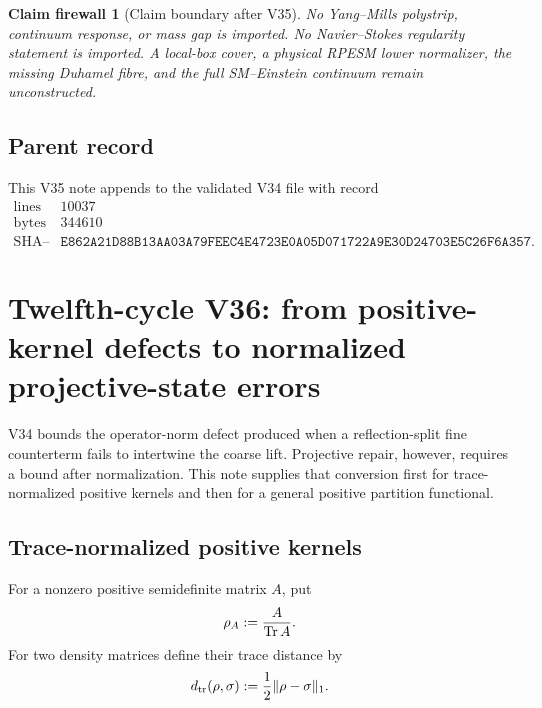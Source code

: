 \documentclass[11pt]{article}
\newtheorem{firewall}[theorem]{Claim firewall}
\theoremstyle{remark}
\begin{document}
\begin{firewall}[Claim boundary after V35]
\label{fire:v12v35-claim}
No Yang--Mills polystrip, continuum response, or mass gap is imported.
No Navier--Stokes regularity statement is imported.  A local-box
cover, a physical RPESM lower normalizer, the missing Duhamel fibre,
and the full SM--Einstein continuum remain unconstructed.
\end{firewall}

\subsection{Parent record}

This V35 note appends to the validated V34 file with record
\[
\begin{array}{c|c}
\text{lines}&10037\\
\text{bytes}&344610\\
\text{SHA--256}&
\texttt{E862A21D88B13AA03A79FEEC4E4723E0A05D071722A9E30D24703E5C26F6A357}.
\end{array}
\]


\section{Twelfth-cycle V36: from positive-kernel defects to
normalized projective-state errors}
\label{sec:v12v36}

V34 bounds the operator-norm defect produced when a
reflection-split fine counterterm fails to intertwine the coarse
lift.  Projective repair, however, requires a bound after
normalization.  This note supplies that conversion first for
trace-normalized positive kernels and then for a general positive
partition functional.

\subsection{Trace-normalized positive kernels}

For a nonzero positive semidefinite matrix \(A\), put
\[
 \rho_A:={A\over\operatorname{Tr}A}.
\]
For two density matrices define their trace distance by
\[
 d_{\rm tr}(\rho,\sigma):={1\over2}\|\rho-\sigma\|_1.
\]
\end{document}

